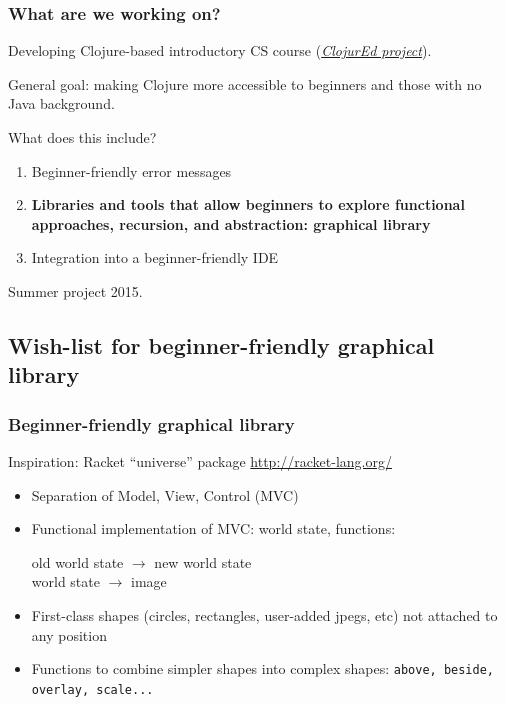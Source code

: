 \documentclass{beamer}
\begin{document}
\begin{frame}
\frametitle{What are we working on?}
Developing Clojure-based introductory CS course ({\it \href{http://cda.morris.umn.edu/~elenam/\#clojure}{ClojurEd project}}). 

General goal: making Clojure more accessible to beginners and those with no Java background. 

What does this include? 
\begin{enumerate}
\item Beginner-friendly error messages 
\item {\bf Libraries and tools that allow beginners to explore functional approaches, recursion, and abstraction: graphical library}
\item Integration into a beginner-friendly IDE
\end{enumerate}
Summer project 2015. 
\end{frame}

\subsection{Wish-list for beginner-friendly graphical library}

\begin{frame}
\frametitle{Beginner-friendly graphical library}
Inspiration: Racket ``universe'' package \href{http://racket-lang.org/}{http://racket-lang.org/}
\begin{itemize}
\item Separation of Model, View, Control (MVC) 
\item Functional implementation of MVC: world state, functions: 

\noindent
old world state $\rightarrow$ new world state \\
world state $\rightarrow$ image 
\item  First-class shapes (circles, rectangles, user-added jpegs, etc) not attached to any position
\item Functions to combine simpler shapes into complex shapes: {\tt above, beside, overlay, scale...}
\end{itemize}
\end{frame}
\end{document}
